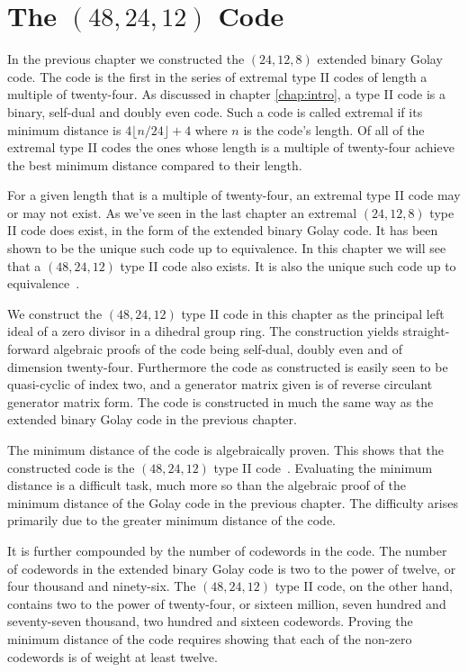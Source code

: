 \chapter{The $(48,24,12)$ Code}
\label{chap:fortyeight}
In the previous chapter we constructed the $(24,12,8)$ extended binary Golay code.
The code is the first in the series of extremal type II codes of length a multiple of twenty-four.
As discussed in chapter \ref{chap:intro}, a type II code is a binary, self-dual and doubly even code.
Such a code is called extremal if its minimum distance is $4 \lfloor n / 24 \rfloor + 4$ where $n$ is the code's length.
Of all of the extremal type II codes the ones whose length is a multiple of twenty-four achieve the best minimum distance compared to their length.

For a given length that is a multiple of twenty-four, an extremal type II code may or may not exist.
As we've seen in the last chapter an extremal $(24,12,8)$ type II code does exist, in the form of the extended binary Golay code.
It has been shown to be the unique such code up to equivalence.
In this chapter we will see that a $(48,24,12)$ type II code also exists.
It is also the unique such code up to equivalence~\cite{hou02}.

We construct the $(48,24,12)$ type II code in this chapter as the principal left ideal of a zero divisor in a dihedral group ring.
The construction yields straight-forward algebraic proofs of the code being self-dual, doubly even and of dimension twenty-four.
Furthermore the code as constructed is easily seen to be quasi-cyclic of index two, and a generator matrix given is of reverse circulant generator matrix form.
The code is constructed in much the same way as the extended binary Golay code in the previous chapter.

The minimum distance of the code is algebraically proven.
This shows that the constructed code is the $(48,24,12)$ type II code~\cite{hou02}.
Evaluating the minimum distance is a difficult task, much more so than the algebraic proof of the minimum distance of the Golay code in the previous chapter.
The difficulty arises primarily due to the greater minimum distance of the code.

It is further compounded by the number of codewords in the code.
The number of codewords in the extended binary Golay code is two to the power of twelve, or four thousand and ninety-six.
The $(48,24,12)$ type II code, on the other hand, contains two to the power of twenty-four, or sixteen million, seven hundred and seventy-seven thousand, two hundred and sixteen codewords.
Proving the minimum distance of the code requires showing that each of the non-zero codewords is of weight at least twelve.

